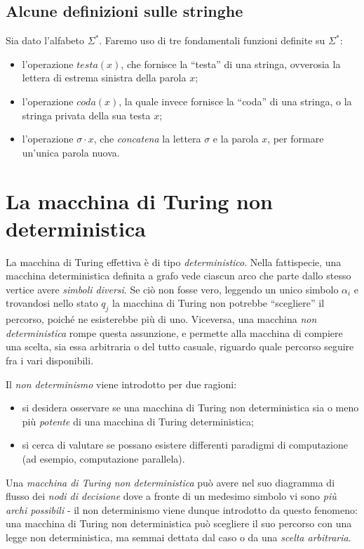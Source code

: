 \documentclass[10pt]{book}
\begin{document}
\subsection{Alcune definizioni sulle stringhe}

Sia dato l'alfabeto $\Sigma^*$. Faremo uso di tre fondamentali funzioni
definite su $\Sigma^*$:
\begin{itemize}
    \item l'operazione $testa(x)$, che fornisce la ``testa'' di una stringa,
        ovverosia la lettera di estrema sinistra della parola $x$;
    \item l'operazione $coda(x)$, la quale invece fornisce la ``coda'' di una
        stringa, o la stringa privata della sua testa $x$;
    \item l'operazione $\sigma \cdot x$, che \emph{concatena} la lettera
        $\sigma$ e la parola $x$, per formare un'unica parola nuova.
\end{itemize}


\section{La macchina di Turing non deterministica}

La macchina di Turing effettiva è di tipo \emph{deterministico}. Nella
fattispecie, una macchina deterministica definita a grafo vede ciascun arco che
parte dallo stesso vertice avere \emph{simboli diversi}. Se ciò non fosse vero,
leggendo un unico simbolo $\alpha_i$ e trovandosi nello stato $q_j$ la macchina
di Turing non potrebbe ``scegliere'' il percorso, poiché ne esisterebbe più di
uno. Viceversa, una macchina \emph{non deterministica} rompe questa assunzione,
e permette alla macchina di compiere una scelta, sia essa arbitraria o del
tutto casuale, riguardo quale percorso seguire fra i vari disponibili. 

Il \emph{non determinismo} viene introdotto per due ragioni:
\begin{itemize}
    \item si desidera osservare se una macchina di Turing non deterministica
        sia o meno più \emph{potente} di una macchina di Turing deterministica;
    \item si cerca di valutare se possano esistere differenti paradigmi di
        computazione (ad esempio, computazione parallela).
\end{itemize}

Una \emph{macchina di Turing non deterministica} può avere nel suo diagramma di
flusso dei \emph{nodi di decisione} dove a fronte di un medesimo simbolo vi
sono \emph{più archi possibili} \-- il non determinismo viene dunque introdotto
da questo fenomeno: una macchina di Turing non deterministica può scegliere il
suo percorso con una legge non deterministica, ma semmai dettata dal caso o da
una \emph{scelta arbitraria}. 
\end{document}

